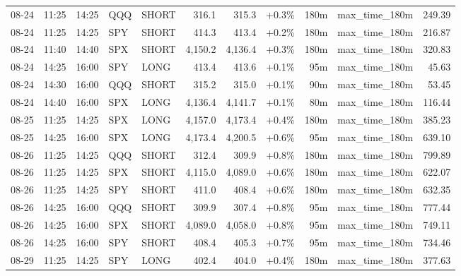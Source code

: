 \documentclass[11pt,a4paper,twoside]{article}
\begin{document}
\begin{center}
\begin{longtable}{>{\color{txtmain}}l l l l l r r r r >{\color{txtmain}}l r}
08-24 & 11:25 & 14:25 & QQQ & SHORT & 316.1 & 315.3 & \textcolor{wingreen}{+0.3\%} & 180m & max\_time\_180m & \textcolor{wingreen}{249.39} \\
08-24 & 11:25 & 14:25 & SPY & SHORT & 414.3 & 413.4 & \textcolor{wingreen}{+0.2\%} & 180m & max\_time\_180m & \textcolor{wingreen}{216.87} \\
08-24 & 11:40 & 14:40 & SPX & SHORT & 4,150.2 & 4,136.4 & \textcolor{wingreen}{+0.3\%} & 180m & max\_time\_180m & \textcolor{wingreen}{320.83} \\
08-24 & 14:25 & 16:00 & SPY & LONG & 413.4 & 413.6 & \textcolor{wingreen}{+0.1\%} & 95m & max\_time\_180m & \textcolor{wingreen}{45.63} \\
08-24 & 14:30 & 16:00 & QQQ & SHORT & 315.2 & 315.0 & \textcolor{wingreen}{+0.1\%} & 90m & max\_time\_180m & \textcolor{wingreen}{53.45} \\
08-24 & 14:40 & 16:00 & SPX & LONG & 4,136.4 & 4,141.7 & \textcolor{wingreen}{+0.1\%} & 80m & max\_time\_180m & \textcolor{wingreen}{116.44} \\
08-25 & 11:25 & 14:25 & SPX & LONG & 4,157.0 & 4,173.4 & \textcolor{wingreen}{+0.4\%} & 180m & max\_time\_180m & \textcolor{wingreen}{385.23} \\
08-25 & 14:25 & 16:00 & SPX & LONG & 4,173.4 & 4,200.5 & \textcolor{wingreen}{+0.6\%} & 95m & max\_time\_180m & \textcolor{wingreen}{639.10} \\
08-26 & 11:25 & 14:25 & QQQ & SHORT & 312.4 & 309.9 & \textcolor{wingreen}{+0.8\%} & 180m & max\_time\_180m & \textcolor{wingreen}{799.89} \\
08-26 & 11:25 & 14:25 & SPX & SHORT & 4,115.0 & 4,089.0 & \textcolor{wingreen}{+0.6\%} & 180m & max\_time\_180m & \textcolor{wingreen}{622.07} \\
08-26 & 11:25 & 14:25 & SPY & SHORT & 411.0 & 408.4 & \textcolor{wingreen}{+0.6\%} & 180m & max\_time\_180m & \textcolor{wingreen}{632.35} \\
08-26 & 14:25 & 16:00 & QQQ & SHORT & 309.9 & 307.4 & \textcolor{wingreen}{+0.8\%} & 95m & max\_time\_180m & \textcolor{wingreen}{777.44} \\
08-26 & 14:25 & 16:00 & SPX & SHORT & 4,089.0 & 4,058.0 & \textcolor{wingreen}{+0.8\%} & 95m & max\_time\_180m & \textcolor{wingreen}{749.11} \\
08-26 & 14:25 & 16:00 & SPY & SHORT & 408.4 & 405.3 & \textcolor{wingreen}{+0.7\%} & 95m & max\_time\_180m & \textcolor{wingreen}{734.46} \\
08-29 & 11:25 & 14:25 & SPY & LONG & 402.4 & 404.0 & \textcolor{wingreen}{+0.4\%} & 180m & max\_time\_180m & \textcolor{wingreen}{377.63} \\

\end{longtable}
\end{center}
\end{document}
